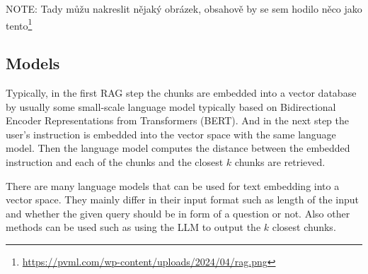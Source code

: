 NOTE: Tady můžu nakreslit nějaký obrázek, obsahově by se sem hodilo něco jako tento\footnote{\url{https://pvml.com/wp-content/uploads/2024/04/rag.png}}


\subsection{Models}

Typically, in the first RAG step the chunks are embedded into a vector database by usually some small-scale language model typically based on Bidirectional Encoder Representations from Transformers (BERT). And in the next step the user's instruction is embedded into the vector space with the same language model. Then the language model computes the distance between the embedded instruction and each of the chunks and the closest $k$ chunks are retrieved.

There are many language models that can be used for text embedding into a vector space. They mainly differ in their input format such as length of the input and whether the given query should be in form of a question or not. Also other methods can be used such as using the LLM to output the $k$ closest chunks.
